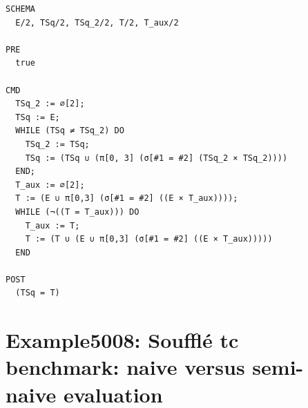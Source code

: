 \documentclass[10pt]{article}
\begin{document}
\begin{Verbatim}[fontsize=\scriptsize,breaklines=true,breakanywhere=true,frame=single,framesep=1.5mm]
SCHEMA
  E/2, TSq/2, TSq_2/2, T/2, T_aux/2

PRE
  true 

CMD
  TSq_2 := ∅[2];
  TSq := E;
  WHILE (TSq ≠ TSq_2) DO
    TSq_2 := TSq;
    TSq := (TSq ∪ (π[0, 3] (σ[#1 = #2] (TSq_2 × TSq_2))))
  END;
  T_aux := ∅[2];
  T := (E ∪ π[0,3] (σ[#1 = #2] ((E × T_aux))));
  WHILE (¬((T = T_aux))) DO
    T_aux := T;
    T := (T ∪ (E ∪ π[0,3] (σ[#1 = #2] ((E × T_aux)))))
  END

POST
  (TSq = T)
\end{Verbatim}

\Needspace{0.45\textheight}

\section{Example5008: Soufflé tc benchmark: naive versus semi-naive evaluation}\label{case:Example5008}
\end{document}
